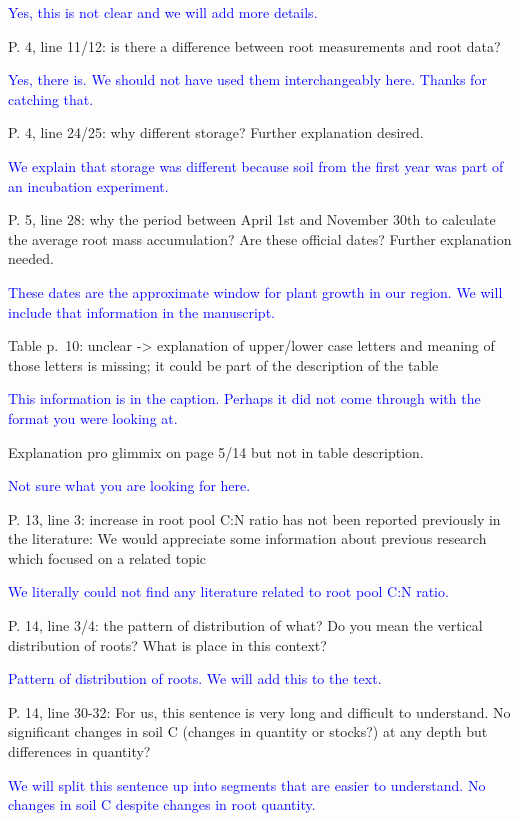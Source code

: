 \documentclass[]{article}
\begin{document}
\textcolor{blue}{Yes, this is not clear and we will add more details.}

P. 4, line 11/12: is there a difference between root measurements and
root data?

\textcolor{blue}{Yes, there is. We should not have used them interchangeably here. Thanks for catching that.}

P. 4, line 24/25: why different storage? Further explanation desired.

\textcolor{blue}{We explain that storage was different because soil from the first year was part of an incubation experiment.}

P. 5, line 28: why the period between April 1st and November 30th to
calculate the average root mass accumulation? Are these official dates?
Further explanation needed.

\textcolor{blue}{These dates are the approximate window for plant growth in our region. We will include that information in the manuscript.}

Table p.~10: unclear -\textgreater{} explanation of upper/lower case
letters and meaning of those letters is missing; it could be part of the
description of the table

\textcolor{blue}{This information is in the caption. Perhaps it did not come through with the format you were looking at.}

Explanation pro glimmix on page 5/14 but not in table description.

\textcolor{blue}{Not sure what you are looking for here.}

P. 13, line 3: increase in root pool C:N ratio has not been reported
previously in the literature: We would appreciate some information about
previous research which focused on a related topic

\textcolor{blue}{We literally could not find any literature related to root pool C:N ratio.}

P. 14, line 3/4: the pattern of distribution of what? Do you mean the
vertical distribution of roots? What is place in this context?

\textcolor{blue}{Pattern of distribution of roots. We will add this to the text.}

P. 14, line 30-32: For us, this sentence is very long and difficult to
understand. No significant changes in soil C (changes in quantity or
stocks?) at any depth but differences in quantity?

\textcolor{blue}{We will split this sentence up into segments that are easier to understand. No changes in soil C despite changes in root quantity.}
\end{document}
